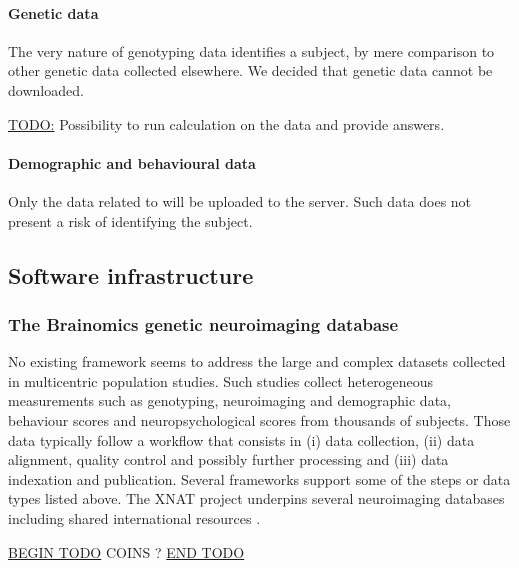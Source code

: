 \documentclass[review]{elsarticle}
\begin{document}
\paragraph{Genetic data} The very nature of genotyping data identifies a subject, by mere comparison to other genetic data collected elsewhere. We decided that genetic data cannot be downloaded.

\underline{TODO:} Possibility to run calculation on the data and provide answers.

\paragraph{Demographic and behavioural data} Only the data related to \cite{Pinel2007} will be uploaded to the server. Such data does not present a risk of identifying the subject.


\subsection{Software infrastructure}

\subsubsection{The Brainomics genetic neuroimaging database}

No existing framework seems to address the large and complex datasets collected in multicentric population studies. Such studies collect heterogeneous measurements such as genotyping, neuroimaging and demographic data, behaviour scores and neuropsychological scores from thousands of subjects. Those data typically follow a workflow that consists in (i) data collection, (ii) data alignment, quality control and possibly further processing and (iii) data indexation and publication. Several frameworks support some of the steps or data types listed above. The XNAT project \cite{XNAT2007} underpins several neuroimaging databases including shared international resources \cite{HBP2012}.

\underline{BEGIN TODO}
COINS ?
\underline{END TODO}
\end{document}
